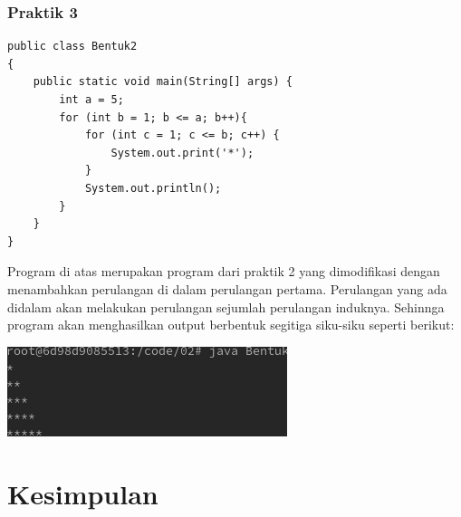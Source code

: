 \documentclass[a4paper,12pt]{article}
\begin{document}
\subsubsection{Praktik 3}
\begin{lstlisting}
public class Bentuk2
{
    public static void main(String[] args) {
        int a = 5;
        for (int b = 1; b <= a; b++){
            for (int c = 1; c <= b; c++) {
                System.out.print('*');
            }
            System.out.println();
        }
    }
}
\end{lstlisting}
Program di atas merupakan program dari praktik 2 yang dimodifikasi dengan menambahkan perulangan di dalam perulangan pertama. Perulangan yang ada didalam akan melakukan perulangan
sejumlah perulangan induknya. Sehinnga program akan menghasilkan output berbentuk segitiga siku-siku seperti berikut:\\
\begin{center}
    \includegraphics[scale=.7]{4.png}
\end{center}

\newpage
\section{Kesimpulan}
\end{document}
